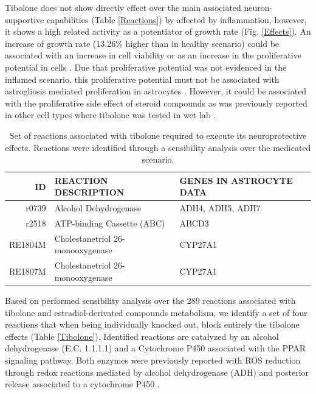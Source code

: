 Tibolone does not show directly effect over the main associated neuron-supportive capabilities (Table \ref{Reactions}) by affected by inflammation, however, it shows a high related activity as a potentiator of growth rate (Fig. \ref{Effects}). An increase of growth rate (13.26\% higher than in healthy scenario) could be associated with an increase in cell viability or as an increase in the proliferative potential in cells \cite{Feist2010}. Due that proliferative potential was not evidenced in the inflamed scenario, this proliferative potential must not be associated with astrogliosis mediated proliferation in astrocytes \cite{Takuma2004}. However, it could be associated with the proliferative side effect of steroid compounds as was previously reported in other cell types where tibolone was tested in wet lab \cite{Colditz1993,Colditz1995}. \\

\begin{table}[h]
\caption{Set of reactions associated with tibolone required to execute its neuroprotective effects. Reactions were identified through a sensibility analysis over the medicated scenario.}	
\label{tibolone}
\begin{center}
\begin{tabular}{rll}
\hline
ID & REACTION DESCRIPTION & GENES IN ASTROCYTE DATA\\
\hline
\hline
r0739 & Alcohol Dehydrogenase & ADH4, ADH5, ADH7\\
r2518 & ATP-binding Cassette (ABC) & ABCD3\\
RE1804M &	Cholestanetriol 26-monooxygenase& CYP27A1 \\
RE1807M & Cholestanetriol 26-monooxygenase& CYP27A1 \\
\hline
\end{tabular}
\end{center}
\end{table}

Based on performed sensibility analysis over the 289 reactions associated with tibolone and estradiol-derivated compounds metabolism, we identify a set of four reactions that when being individually knocked out, block entirely the tibolone effects (Table \ref{Tibolone}). Identified reactions are catalyzed by an alcohol dehydrogenase (E.C. 1.1.1.1) and a Cytochrome P450 associated with the PPAR signaling pathway. Both enzymes were previously reported with ROS reduction through redox reactions mediated by alcohol dehydrogenase (ADH) and posterior release associated to a cytochrome P450 \cite{Pessayre2001, Sun2009}. 

